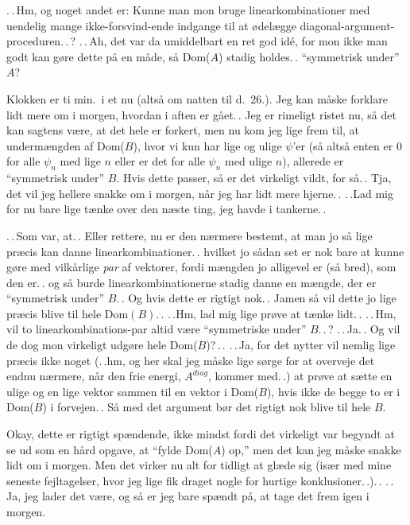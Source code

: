 \documentclass{report}
\begin{document}
.\,.\,Hm, og noget andet er: Kunne man mon bruge linearkombinationer med uendelig mange ikke-forsvind-ende indgange til at ødelægge diagonal-argument-proceduren.\,.\,? .\,.\,Ah, det var da umiddelbart en ret god idé, for mon ikke man godt kan gøre dette på en måde, så Dom($A$) stadig holdes.\,. ``symmetrisk under'' $A$? 


Klokken er ti min.\ i et nu (altså om natten til d.\ 26.). Jeg kan måske forklare lidt mere om i morgen, hvordan i aften er gået.\,. Jeg er rimeligt ristet nu, så det kan sagtens være, at det hele er forkert, men nu kom jeg lige frem til, at undermængden af Dom($B$), hvor vi kun har lige og ulige $\psi$'er (så altså enten er 0 for alle $\psi_n$ med lige $n$ eller er det for alle $\psi_n$ med ulige $n$), allerede er ``symmetrisk under'' $B$. Hvis dette passer, så er det virkeligt vildt, for så.\,. Tja, det vil jeg hellere snakke om i morgen, når jeg har lidt mere hjerne.\,. .\,.Lad mig for nu bare lige tænke over den næste ting, jeg havde i tankerne.\,. 

.\,.\,Som var, at.\,. Eller rettere, nu er den nærmere bestemt, at man jo så lige præcis kan danne linearkombinationer.\,. hvilket jo sådan set er nok bare at kunne gøre med vilkårlige \emph{par} af vektorer, fordi mængden jo alligevel er (så bred), som den er.\,. og så burde linearkombinationerne stadig danne en mængde, der er ``symmetrisk under'' $B$.\,. Og hvis dette er rigtigt nok.\,. Jamen så vil dette jo lige præcis blive til hele Dom$(B)$.\,. .\,.Hm, lad mig lige prøve at tænke lidt.\,. .\,.\,Hm, vil to linearkombinations-par altid være ``symmetriske under'' $B$.\,.\,? .\,.\,Ja.\,. Og vil de dog mon virkeligt udgøre hele Dom($B$)?\,.\,. .\,.\,Ja, for det nytter vil nemlig lige præcis ikke noget (.\,.hm, og her skal jeg måske lige sørge for at overveje det endnu nærmere, når den frie energi, $A^{diag}$, kommer med.\,.) at prøve at sætte en ulige og en lige vektor sammen til en vektor i Dom($B$), hvis ikke de begge to er i Dom($B$) i forvejen.\,. Så med det argument bør det rigtigt nok blive til hele $B$. 

Okay, dette er rigtigt spændende, ikke mindst fordi det virkeligt var begyndt at se ud som en hård opgave, at ``fylde Dom($A$) op,'' men det kan jeg måske snakke lidt om i morgen. Men det virker nu alt for tidligt at glæde sig (især med mine seneste fejltagelser, hvor jeg lige fik draget nogle for hurtige konklusioner.\,.).\,. .\,.\,Ja, jeg lader det være, og så er jeg bare spændt på, at tage det frem igen i morgen. 
\end{document}
